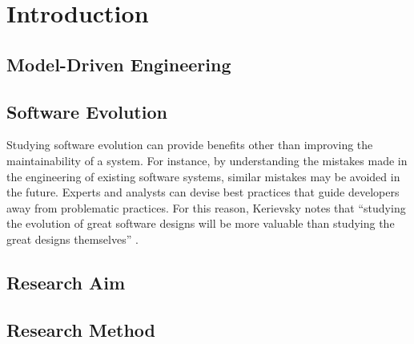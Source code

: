 
\chapter{Introduction}

\section{Model-Driven Engineering}

\section{Software Evolution}

Studying software evolution can provide benefits other than improving the maintainability of a system. For instance, by understanding the mistakes made in the engineering of existing software systems, similar mistakes may be avoided in the future. Experts and analysts can devise best practices that guide developers away from problematic practices. For this reason, Kerievsky notes that ``studying the evolution of great software designs will be more valuable than studying the great designs themselves'' \cite{kerievsky04refactoring}.


\section{Research Aim}

\section{Research Method}
\label{sec:research_method}

